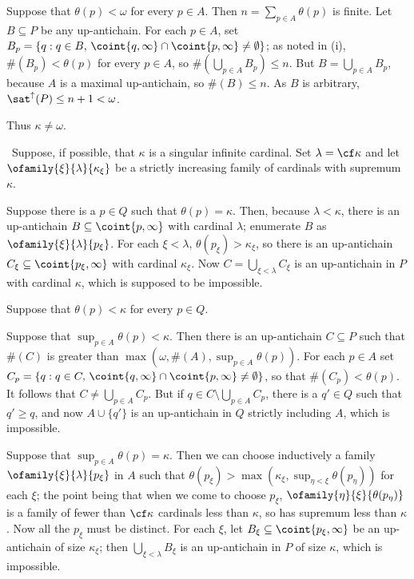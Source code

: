 {\medskip

 Suppose that $\theta(p)<\omega$ for every $p\in A$.
Then $n=\sum_{p\in A}\theta(p)$ is finite.   Let $B\subseteq P$ be any
up-antichain.   For each $p\in A$, set
$B_p=\{q:q\in B,\,\coint{q,\infty}\cap\coint{p,\infty}\ne\emptyset\}$;
as noted in (i), $\#(B_p)<\theta(p)$ for every $p\in A$, so
$\#(\bigcup_{p\in A}B_p)\le n$.   But
$B=\bigcup_{p\in A}B_p$, because $A$ is a maximal up-antichain, so
$\#(B)\le n$.   As $B$ is arbitrary,
$\sat^{\uparrow}(P)\le n+1<\omega$.\ \Bang

Thus $\kappa\ne\omega$.

\medskip

 \Quer\ Suppose, if possible, that $\kappa$
is a singular infinite cardinal.   Set $\lambda=\cf\kappa$ and let
$\ofamily{\xi}{\lambda}{\kappa_{\xi}}$ be a strictly increasing family
of cardinals with supremum $\kappa$.

\medskip

 Suppose there is a $p\in Q$ such that
$\theta(p)=\kappa$.   Then, because $\lambda<\kappa$, there is an
up-antichain $B\subseteq\coint{p,\infty}$ with cardinal $\lambda$;
enumerate $B$ as $\ofamily{\xi}{\lambda}{p_{\xi}}$.   For each
$\xi<\lambda$, $\theta(p_{\xi})>\kappa_{\xi}$, so there is an
up-antichain $C_{\xi}\subseteq\coint{p_{\xi},\infty}$ with cardinal
$\kappa_{\xi}$.   Now $C=\bigcup_{\xi<\lambda}C_{\xi}$ is an
up-antichain in $P$ with cardinal $\kappa$, which is supposed to be
impossible.

\medskip

 Suppose that $\theta(p)<\kappa$ for every $p\in Q$.

\medskip

\qquad{} Suppose that $\sup_{p\in A}\theta(p)<\kappa$.
Then there is an up-antichain $C\subseteq P$ such that
$\#(C)$ is greater than
$\max(\omega,\#(A),\sup_{p\in A}\theta(p))$.   For each $p\in A$ set
$C_p=\{q:q\in C,\,\coint{q,\infty}\cap\coint{p,\infty}\ne\emptyset\}$,
so that $\#(C_p)<\theta(p)$.   It follows that
$C\ne\bigcup_{p\in A}C_p$.   But if
$q\in C\setminus\bigcup_{p\in A}C_p$, there is a $q'\in Q$ such that
$q'\ge q$, and now $A\cup\{q'\}$ is an up-antichain in $Q$ strictly
including  $A$, which is impossible.

\medskip

\qquad{} Suppose that $\sup_{p\in A}\theta(p)=\kappa$.
Then we can choose inductively a family
$\ofamily{\xi}{\lambda}{p_{\xi}}$ in $A$ such that
$\theta(p_{\xi})>\max(\kappa_{\xi},\sup_{\eta<\xi}\theta(p_{\eta}))$ for
each $\xi$;  the point being that when we come to choose $p_{\xi}$,
$\ofamily{\eta}{\xi}{\theta(p_{\eta})}$ is a family of fewer than
$\cf\kappa$ cardinals less than $\kappa$, so has supremum less than
$\kappa$.   Now all the $p_{\xi}$ must be distinct.   For each $\xi$,
let $B_{\xi}\subseteq\coint{p_{\xi},\infty}$ be an up-antichain of size
$\kappa_{\xi}$;  then $\bigcup_{\xi<\lambda}B_{\xi}$ is an up-antichain
in $P$ of size $\kappa$, which is impossible.\ \Bang

}
